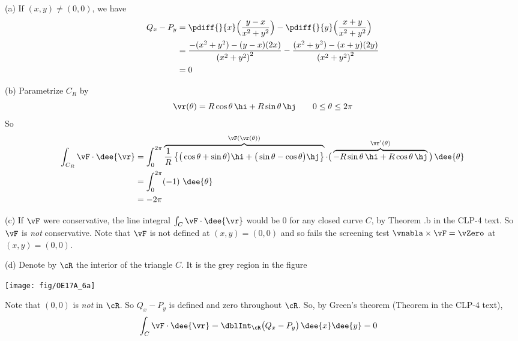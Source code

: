 \begin{solution} (a)  If $(x,y)\ne (0,0)$, we have
\begin{align*}
Q_x - P_y
&=\pdiff{}{x}\Big(\frac{y-x}{x^2+y^2}\Big)
-\pdiff{}{y}\Big(\frac{x+y}{x^2+y^2}\Big) \\
&=\frac{-(x^2+y^2)-(y-x)(2x)}{{(x^2+y^2)}^2}
      -\frac{(x^2+y^2)-(x+y)(2y)}{{(x^2+y^2)}^2}\\
&=0
\end{align*}

(b) Parametrize $C_R$ by
\begin{equation*}
\vr(\theta) = R\cos\theta\,\hi +R\sin\theta\,\hj\qquad
0\le\theta\le 2\pi
\end{equation*}
So
\begin{align*}
\int_{C_R} \vF \cdot \dee{\vr}
&=\int_0^{2\pi} \overbrace{\frac{1}{R}
   \left\{\big(\cos\theta+\sin\theta\big)\hi
           +\big(\sin\theta-\cos\theta\big)\hj\right\}}^{\vF(\vr(\theta))}
       \cdot
     \big(\overbrace{-R\sin\theta\,\hi+R\cos\theta\,\hj}^{\vr'(\theta)}\big)
           \,\dee{\theta}
\\
&=\int_0^{2\pi}(-1)\ \dee{\theta} \\
&=-2\pi
\end{align*}

(c) If $\vF$ were conservative, the line integral $\int_C\vF\cdot\dee{\vr}$
would be $0$ for any closed curve $C$, by
Theorem .b in the CLP-4 text.
So $\vF$ is \emph{not} conservative. Note that $\vF$ is not defined at
$(x,y) = (0,0)$ and so fails the screening
test $\vnabla\times\vF=\vZero$ at $(x,y)=(0,0)$.

(d) Denote by $\cR$ the interior of the triangle $C$. It is the grey
region in the figure
\begin{center}
     \texttt{[image: fig/OE17A\_6a]}
\end{center}
Note that $(0,0)$ is \emph{not} in $\cR$. So $Q_x - P_y$ is defined
and zero throughout $\cR$. So, by Green's theorem  (Theorem  in the CLP-4 text),
\begin{align*}
\int_C \vF \cdot \dee{\vr}
&= \dblInt_\cR\big(Q_x - P_y\big)\,\dee{x}\dee{y}
=0
\end{align*}


\end{solution}
